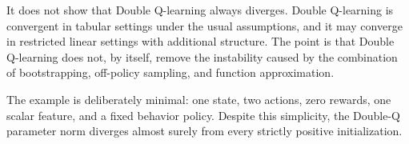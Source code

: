 \documentclass[11pt]{article}
\begin{document}
It does not show that Double Q-learning always diverges. Double Q-learning is convergent in tabular settings under the usual assumptions, and it may converge in restricted linear settings with additional structure. The point is that Double Q-learning does not, by itself, remove the instability caused by the combination of bootstrapping, off-policy sampling, and function approximation.

The example is deliberately minimal: one state, two actions, zero rewards, one scalar feature, and a fixed behavior policy. Despite this simplicity, the Double-Q parameter norm diverges almost surely from every strictly positive initialization.
\end{document}
